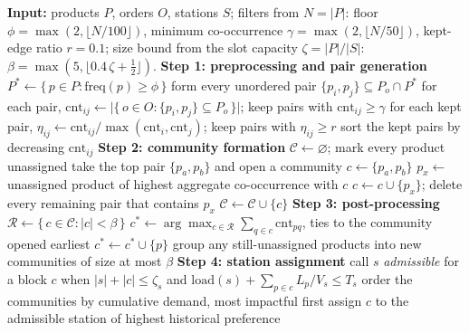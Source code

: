 \documentclass[11pt]{article}
\begin{document}
\begin{algorithm}[H]
\caption{Greedy product clustering and station assignment}
\label{alg:heuristic}
\begin{algorithmic}[1]
\State \textbf{Input:} products $P$, orders $O$, stations $S$; filters from $N=|P|$: floor $\phi=\max(2,\lfloor N/100\rfloor)$, minimum co-occurrence $\gamma=\max(2,\lfloor N/50\rfloor)$, kept-edge ratio $r=0.1$; size bound from the slot capacity $\zeta=|P|/|S|$: $\beta=\max(5,\lfloor 0.4\,\zeta+\tfrac12\rfloor)$.
\Statex
\State \textbf{Step 1: preprocessing and pair generation}
\State $P^{\ast}\gets\{\,p\in P:\mathrm{freq}(p)\ge\phi\,\}$
  \State form every unordered pair $\{p_i,p_j\}\subseteq P_o\cap P^{\ast}$
\EndFor
\State for each pair, $\mathrm{cnt}_{ij}\gets\lvert\{\,o\in O:\{p_i,p_j\}\subseteq P_o\,\}\rvert$; keep pairs with $\mathrm{cnt}_{ij}\ge\gamma$
\State for each kept pair, $\eta_{ij}\gets\mathrm{cnt}_{ij}/\max(\mathrm{cnt}_i,\mathrm{cnt}_j)$; keep pairs with $\eta_{ij}\ge r$
\State sort the kept pairs by decreasing $\mathrm{cnt}_{ij}$
\Statex
\State \textbf{Step 2: community formation}
\State $\mathcal{C}\gets\varnothing$; mark every product unassigned
  \State take the top pair $\{p_a,p_b\}$ and open a community $c\gets\{p_a,p_b\}$
    \State $p_x\gets$ unassigned product of highest aggregate co-occurrence with $c$
    \State $c\gets c\cup\{p_x\}$; delete every remaining pair that contains $p_x$
  \EndWhile
  \State $\mathcal{C}\gets\mathcal{C}\cup\{c\}$
\EndWhile
\Statex
\State \textbf{Step 3: post-processing}
  \State $\mathcal{R}\gets\{\,c\in\mathcal{C}:|c|<\beta\,\}$ 
    \State $c^{\ast}\gets\arg\max_{c\in\mathcal{R}}\sum_{q\in c}\mathrm{cnt}_{pq}$, ties to the community opened earliest
    \State $c^{\ast}\gets c^{\ast}\cup\{p\}$
  \EndIf
\EndFor
\State group any still-unassigned products into new communities of size at most $\beta$
\Statex
\State \textbf{Step 4: station assignment}
\State call $s$ \emph{admissible} for a block $c$ when $|s|+|c|\le\zeta_s$ and $\mathrm{load}(s)+\sum_{p\in c}L_p/V_s\le T_s$
\State order the communities by cumulative demand, most impactful first
    \State assign $c$ to the admissible station of highest historical preference

\end{algorithmic}
\end{algorithm}
\end{document}
